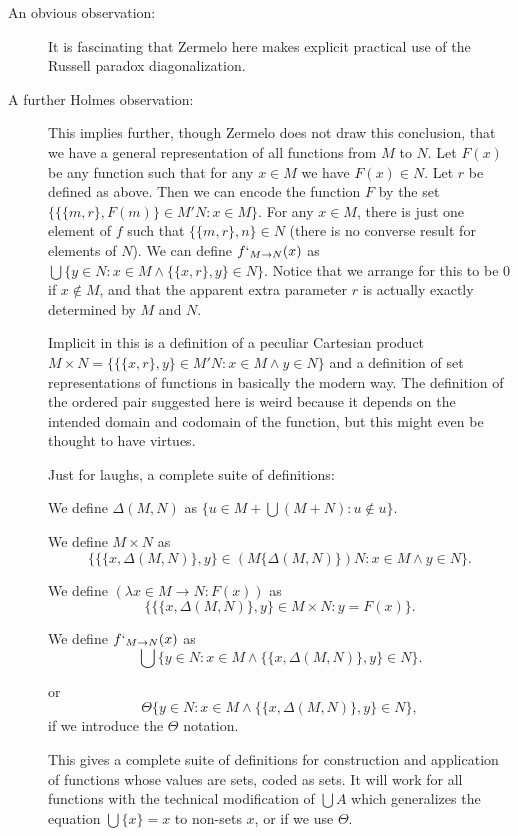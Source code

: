 \documentclass[12pt]{article}
\begin{document}
\begin{enumerate}
\begin{description}
\item[An obvious observation:]  It is fascinating that Zermelo here makes explicit practical use of the Russell paradox diagonalization.

\item[A further Holmes observation:]  This implies further, though Zermelo does not draw this conclusion, that we have a general representation of all functions from $M$ to $N$.
Let $F(x)$ be any function such that for any $x \in M$ we have $F(x) \in N$.  Let $r$ be defined as above.  Then we can encode the function $F$ by the set
$\{\{\{m,r\},F(m)\}\in M'N:x \in M\}$.  For any $x \in M$, there is just one element of $f$ such that $\{\{m,r\},n\} \in N$ (there is no converse result for elements of $N$).
We can define $f`_{M\rightarrow N}(x)$ as $\bigcup \{y \in N: x\in M \wedge \{\{x,r\},y\} \in N\}$.  Notice that we arrange for this to be 0 if $x \not\in M$, and that the apparent extra parameter $r$ is actually exactly determined by $M$ and $N$.

Implicit in this is a definition of a peculiar Cartesian product $M \times N = \{\{\{x,r\},y\}\in M'N:x \in M \wedge y \in N\}$ and a definition of set representations of functions in basically the modern way.  The definition of the ordered pair suggested here is weird because it depends on the intended domain and codomain of the function, but this might even be thought to have virtues.

Just for laughs, a complete suite of definitions:

We define $\Delta(M,N)$ as $\{u \in M + \bigcup(M+N):u \not\in u\}$.

We define $M \times N$ as $$\{\{\{x,\Delta(M,N)\},y\}\in (M\{\Delta(M,N)\})N :x \in M \wedge y \in N\}.$$

We define $(\lambda x \in M \rightarrow N:F(x))$ as $$\{\{\{x,\Delta(M,N)\},y\} \in M \times N:y = F(x)\}.$$

We define $f`_{M\rightarrow N}(x)$ as $$\bigcup \{y \in N: x\in M \wedge \{\{x,\Delta(M,N)\},y\} \in N\}.$$

or $$\Theta \{y \in N: x\in M \wedge \{\{x,\Delta(M,N)\},y\} \in N\},$$  if we introduce the $\Theta$ notation.

This gives a complete suite of definitions for construction and application of functions whose values are sets, coded as sets.  It will work for all functions
with the technical modification of $\bigcup A$ which generalizes the equation $\bigcup \{x\}=x$ to non-sets $x$, or if we use $\Theta$.


\end{description}
\end{enumerate}
\end{document}
